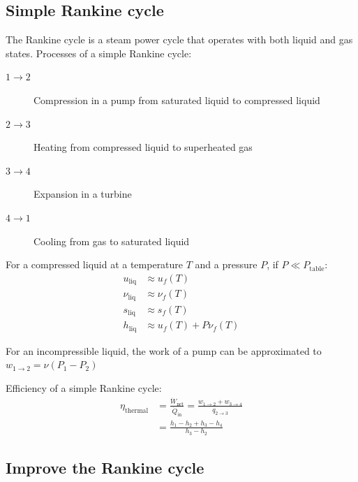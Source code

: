 \documentclass[10pt, twocolumn]{article}
\begin{document}
\subsection{Simple Rankine cycle}
The Rankine cycle is a steam power cycle that operates with both liquid and gas states.
Processes of a simple Rankine cycle:
\begin{description}
  \item[\(1 \rightarrow 2\)] Compression in a pump from saturated liquid to compressed liquid
  \item[\(2 \rightarrow 3\)] Heating from compressed liquid to superheated gas
  \item[\(3 \rightarrow 4\)] Expansion in a turbine
  \item[\(4 \rightarrow 1\)] Cooling from gas to saturated liquid
\end{description}

For a compressed liquid at a temperature \(T\) and a pressure \(P\), if \(P \ll P_\mathrm{table}\):
\begin{align*}
  u_\mathrm{liq}   & \approx u_f (T)              \\
  \nu_\mathrm{liq} & \approx \nu_f (T)            \\
  s_\mathrm{liq}   & \approx s_f (T)              \\
  h_\mathrm{liq}   & \approx u_f (T) + P\nu_f (T)
\end{align*}

For an incompressible liquid, the work of a pump can be approximated to \(w_{1 \to 2} = \nu(P_1 - P_2 )\)

Efficiency of a simple Rankine cycle:
\[
  \begin{split}
    \eta_\mathrm{thermal} & = \frac{\dot{W}_\mathrm{net}}{\dot{Q}_\mathrm{in}} = \frac{w_{1 \to 2} + w_{3 \to 4}}{q_{2 \to 3}} \\
    & = \frac{h_1 - h_2 + h_3 - h_4 }{h_3 - h_2 }
  \end{split}
\]

\subsection{Improve the Rankine cycle}
\end{document}
